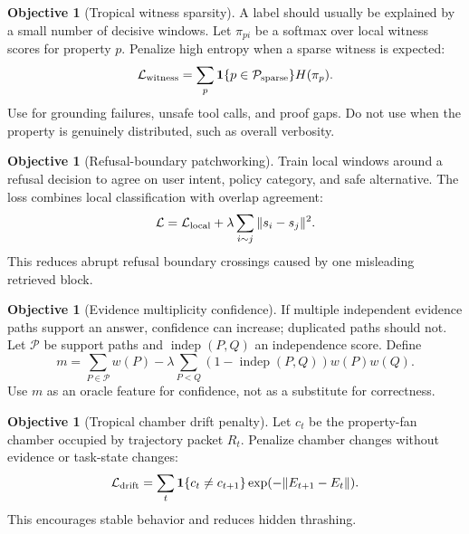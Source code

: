 \documentclass[11pt]{article}
\theoremstyle{definition}
\newtheorem{objective}[theorem]{Objective}
\theoremstyle{remark}
\newcommand{\loss}{\mathcal{L}}
\newcommand{\Prop}{\mathcal{P}}
\numberwithin{equation}{section}
\begin{document}
\begin{objective}[Tropical witness sparsity]
A label should usually be explained by a small number of decisive windows.  Let \(\pi_{pi}\) be a softmax over local witness scores for property \(p\).  Penalize high entropy when a sparse witness is expected:
\begin{equation}
    \loss_{\rm witness}=\sum_p \mathbf 1\{p\in\Prop_{\rm sparse}\}H(\pi_p).
\end{equation}
Use for grounding failures, unsafe tool calls, and proof gaps.  Do not use when the property is genuinely distributed, such as overall verbosity.
\end{objective}

\begin{objective}[Refusal-boundary patchworking]
Train local windows around a refusal decision to agree on user intent, policy category, and safe alternative.  The loss combines local classification with overlap agreement:
\begin{equation}
    \loss=\loss_{\rm local}+\lambda\sum_{i\sim j}\|s_i-s_j\|^2.
\end{equation}
This reduces abrupt refusal boundary crossings caused by one misleading retrieved block.
\end{objective}

\begin{objective}[Evidence multiplicity confidence]
If multiple independent evidence paths support an answer, confidence can increase; duplicated paths should not.  Let \(\mathcal P\) be support paths and \(\operatorname{indep}(P,Q)\) an independence score.  Define
\begin{equation}
    m=\sum_{P\in\mathcal P} w(P)-\lambda\sum_{P<Q}(1-\operatorname{indep}(P,Q))w(P)w(Q).
\end{equation}
Use \(m\) as an oracle feature for confidence, not as a substitute for correctness.
\end{objective}

\begin{objective}[Tropical chamber drift penalty]
Let \(c_t\) be the property-fan chamber occupied by trajectory packet \(R_t\).  Penalize chamber changes without evidence or task-state changes:
\begin{equation}
    \loss_{\rm drift}=\sum_t \mathbf 1\{c_t\ne c_{t+1}\}\exp(-\|E_{t+1}-E_t\|).
\end{equation}
This encourages stable behavior and reduces hidden thrashing.
\end{objective}
\end{document}
